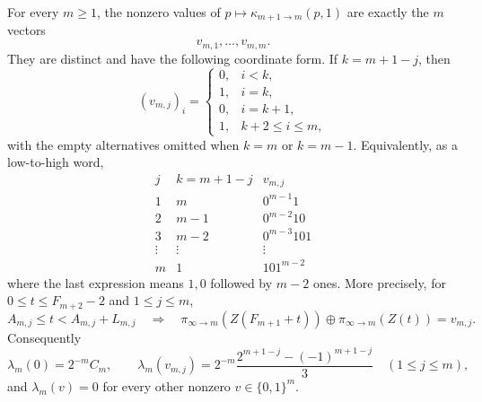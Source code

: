 \begin{proposition}
\label{prop:adjacent-kernel-support}
For every $m\ge 1$, the nonzero values of
$p\mapsto\kappa_{m+1\to m}(p,1)$ are exactly the $m$ vectors
\[
v_{m,1},\dots,v_{m,m}.
\]
They are distinct and have the following coordinate form.  If
$k=m+1-j$, then
\[
(v_{m,j})_i=
\begin{cases}
0,& i<k,\\
1,& i=k,\\
0,& i=k+1,\\
1,& k+2\le i\le m,
\end{cases}
\]
with the empty alternatives omitted when $k=m$ or $k=m-1$.  Equivalently,
as a low-to-high word,
\[
\begin{array}{c|c|c}
j & k=m+1-j & v_{m,j}\\ \hline
1&m&0^{m-1}1\\
2&m-1&0^{m-2}10\\
3&m-2&0^{m-3}101\\
\vdots&\vdots&\vdots\\
m&1&101^{m-2}
\end{array}
\]
where the last expression means $1,0$ followed by $m-2$ ones.  More precisely,
for $0\le t\le F_{m+2}-2$ and $1\le j\le m$,
\[
A_{m,j}\le t<A_{m,j}+L_{m,j}
\quad\Longrightarrow\quad
\pi_{\infty\to m}(Z(F_{m+1}+t))
\oplus
\pi_{\infty\to m}(Z(t))=v_{m,j}.
\]
Consequently
\[
\lambda_m(0)=2^{-m}C_m,
\qquad
\lambda_m(v_{m,j})=2^{-m}\frac{2^{m+1-j}-(-1)^{m+1-j}}{3}
\quad (1\le j\le m),
\]
and $\lambda_m(v)=0$ for every other nonzero $v\in\{0,1\}^m$.
\end{proposition}

